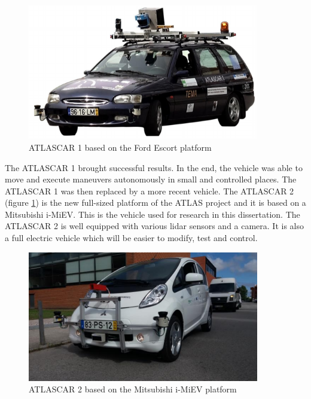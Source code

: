 \begin{figure}[htp]
	
	\centering
	\includegraphics[width=0.9\textwidth]{capintro/imgs/atlascar1}
	
	\caption{ATLASCAR 1 based on the Ford Escort platform}
	\label{fig:atlascar1}
	
\end{figure}

The ATLASCAR 1 brought successful results. In the end, the vehicle was able to move and execute maneuvers autonomously in small and controlled places. The ATLASCAR 1 was then replaced by a more recent vehicle. The ATLASCAR 2 (figure \ref{fig:atlascar1}) is the new full-sized platform of the ATLAS project and it is based on a Mitsubishi i-MiEV. This is the vehicle used for research in this dissertation. The ATLASCAR 2 is well equipped with various \gls{lidar} sensors and a camera. It is also a full electric vehicle which will be easier to modify, test and control. 

\begin{figure}[htp]
	
	\centering
	\includegraphics[width=0.9\textwidth]{capintro/imgs/atlascar2}
	
	\caption{ATLASCAR 2 based on the Mitsubishi i-MiEV platform}
	\label{fig:atlascar2}
	
\end{figure}


